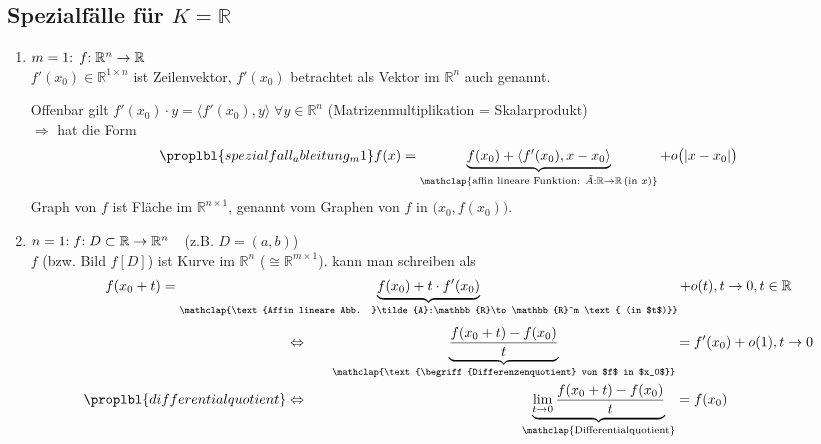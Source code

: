 \subsection{Spezialfälle für \texorpdfstring{$K=\mathbb{R}$}{K=R}}
\begin{enumerate}[label={\arabic*)},leftmargin=\widthof{1)\ },topsep=-5pt]
	\item {} \uline{$m=1\negthickspace:\, f\negthickspace:\mathbb{R}^n\to \mathbb{R}$}\\[0.6ex]
	$f'(x_0)\in \mathbb{R}^{1\times n}$ ist Zeilenvektor, $f'(x_0)$ betrachtet als Vektor im $\mathbb{R}^n$ auch  genannt.
	
	Offenbar gilt $f'(x_0)\cdot y = \langle f'(x_0), y\rangle\;\forall y\in\mathbb{R}^n$ (Matrizenmultiplikation = Skalarprodukt) \\
	$\Rightarrow$  hat die Form \begin{align}
		\proplbl{spezialfall_ableitung_m1}
		f(x) = \underbrace{f(x_0) + \langle f'(x_0), x - x_0\rangle}_{\mathclap{\text{affin lineare Funktion: }\tilde{A}: \mathbb{R}\to \mathbb{R} \,(\text{in }x)}} + o\big( \vert x - x_0\vert \big)
	\end{align}
	Graph von $f$ ist Fläche im $\mathbb{R}^{n\times 1}$, genannt  vom Graphen von $f$ in $\big(x_0, f(x_0)\big)$.
	
	\item {} \uline{$n=1\negthickspace: f\negthickspace: D\subset \mathbb{R}\to \mathbb{R}^n$}\ \ (z.B. $D=(a,b)$)\\[0.6ex]
	$f$ (bzw.  Bild $f[D]$) ist Kurve im $\mathbb{R}^n$ ($\cong \mathbb{R}^{m\times 1}$).  kann man schreiben als \begin{align*}
		f(x_0 + t) = \underbrace{f(x_0) + t\cdot f'(x_0)}_{\mathclap{\text{Affin lineare Abb. }\tilde{A}:\mathbb{R}\to \mathbb{R}^m \text{ (in $t$)}}} + o(t), t\to 0, t\in\mathbb{R}
	\end{align*}
	\zeroAmsmathAlignVSpaces
	\begin{alignat}{2}
		\notag &\Leftrightarrow\quad& \underbrace{\frac{f(x_0 + t) - f(x_0)}{t}}_{\mathclap{\text{\begriff{Differenzenquotient} von $f$ in $x_0$}}} &= f'(x_0) + o(1), t\to 0 \\
		\proplbl{differentialquotient} &\Leftrightarrow& \underbrace{\lim\limits_{t\to 0} \frac{f(x_0 + t) - f(x_0)}{t}}_{\mathclap{\text{Differentialquotient}}} &= f(x_0)
	\end{alignat}
	

\end{enumerate}
